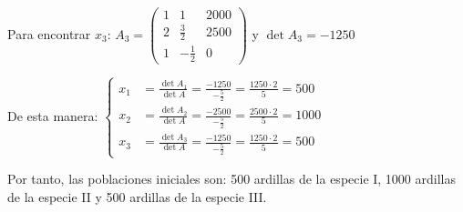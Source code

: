\begin{prob}
\begin{myproof}
Para encontrar $x_3$: \(
A_3 = \begin{pmatrix}
1 & 1 & 2000\\
2 & \frac{3}{2} & 2500\\
1 & -\frac{1}{2} & 0
\end{pmatrix}
\) y \(
\det A_3 = -1250 \)

De esta manera: $\begin{cases}
x_1 &= \frac{\det A_1}{\det A} = \frac{-1250}{-\frac{5}{2}} = \frac{1250 \cdot 2}{5} = 500\\
x_2 &= \frac{\det A_2}{\det A} = \frac{-2500}{-\frac{5}{2}} = \frac{2500 \cdot 2}{5} = 1000\\
x_3 &= \frac{\det A_3}{\det A} = \frac{-1250}{-\frac{5}{2}} = \frac{1250 \cdot 2}{5} = 500
\end{cases}$

Por tanto, las poblaciones iniciales son: 500 ardillas de la especie I, 1000 ardillas de la especie II y 500 ardillas de la especie III.
\end{myproof}
\end{prob}


